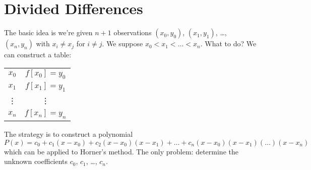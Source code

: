 \section{Divided Differences}

The basic idea is we're given $n+1$ observations $(x_{0},y_{0})$,
$(x_{1},y_{1})$, \dots, $(x_{n}, y_{n})$ with $x_{i}\neq x_{j}$ for
$i\neq j$. We suppose $x_{0} < x_{1} < \dots < x_{n}$. What to do? We
can construct a table:
\begin{center}
  \begin{tabular}{c|c}
    $x_{0}$ & $f[x_{0}]=y_{0}$\\
    $x_{1}$ & $f[x_{1}]=y_{1}$\\
    \vdots & \vdots\\
    $x_{n}$ & $f[x_{n}]=y_{n}$
  \end{tabular}
\end{center}
The strategy is to construct a polynomial
\begin{equation}
  P(x) = c_{0} + c_{1}(x - x_{0}) + c_{2}(x - x_{0})(x - x_{1}) + \dots
  + c_{n}(x - x_{0})(x - x_{1})(\dots)(x - x_{n})
\end{equation}
which can be applied to Horner's method. The only problem: determine the
unknown coefficients $c_{0}$, $c_{1}$, \dots, $c_{n}$.

